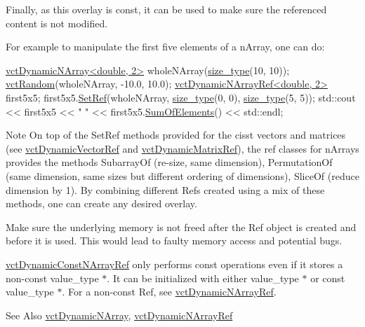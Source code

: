 Finally, as this overlay is const, it can be used to make sure the referenced content is not modified.

For example to manipulate the first five elements of a n\-Array, one can do\-: 
\begin{DoxyCode}
\hyperlink{classvct_dynamic_n_array}{vctDynamicNArray<double, 2>} wholeNArray(\hyperlink{namespacevct_a3e2935e13aac4500965e00d30565775b}{size\_type}(10, 10));
\hyperlink{group__cisst_vector_ga0d25660a2dc6ef9c093f6f6b2804d2d0}{vctRandom}(wholeNArray, -10.0, 10.0);
\hyperlink{classvct_dynamic_n_array_ref}{vctDynamicNArrayRef<double, 2>} first5x5;
first5x5.\hyperlink{classvct_dynamic_n_array_ref_a395385ec68aafaea6e60af8bd330eb82}{SetRef}(wholeNArray, \hyperlink{namespacevct_a3e2935e13aac4500965e00d30565775b}{size\_type}(0, 0), \hyperlink{namespacevct_a3e2935e13aac4500965e00d30565775b}{size\_type}(5, 5));
std::cout << first5x5 << \textcolor{stringliteral}{" "} << first5x5.\hyperlink{classvct_dynamic_const_n_array_base_a57b568c584c363c2811e5c1020484a57}{SumOfElements}() << std::endl;
\end{DoxyCode}


\begin{DoxyNote}{Note}
On top of the Set\-Ref methods provided for the cisst vectors and matrices (see \hyperlink{classvct_dynamic_vector_ref}{vct\-Dynamic\-Vector\-Ref} and \hyperlink{classvct_dynamic_matrix_ref}{vct\-Dynamic\-Matrix\-Ref}), the ref classes for n\-Arrays provides the methods Subarray\-Of (re-\/size, same dimension), Permutation\-Of (same dimension, same sizes but different ordering of dimensions), Slice\-Of (reduce dimension by 1). By combining different Refs created using a mix of these methods, one can create any desired overlay.

Make sure the underlying memory is not freed after the Ref object is created and before it is used. This would lead to faulty memory access and potential bugs.

\hyperlink{classvct_dynamic_const_n_array_ref}{vct\-Dynamic\-Const\-N\-Array\-Ref} only performs const operations even if it stores a non-\/const {\ttfamily value\-\_\-type $\ast$}. It can be initialized with either {\ttfamily value\-\_\-type $\ast$} or {\ttfamily const value\-\_\-type $\ast$}. For a non-\/const Ref, see \hyperlink{classvct_dynamic_n_array_ref}{vct\-Dynamic\-N\-Array\-Ref}.
\end{DoxyNote}
\begin{DoxySeeAlso}{See Also}
\hyperlink{classvct_dynamic_n_array}{vct\-Dynamic\-N\-Array}, \hyperlink{classvct_dynamic_n_array_ref}{vct\-Dynamic\-N\-Array\-Ref}
\end{DoxySeeAlso}

